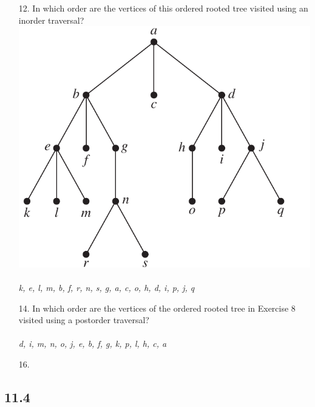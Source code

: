 \begin{itemize}
    \item[12.]  In which order are the vertices of this ordered rooted tree
          visited using an inorder traversal? \\
          \includegraphics[scale=0.6]{img/11_3_12_tree.png} \\
          \answer \\
         \textit{k, e, l, m, b, f, r, n, s, g, a, c, o, h, d, i, p, j, q}

    \item[14.] In which order are the vertices of the ordered rooted tree
in Exercise 8 visited using a postorder traversal?\\
\answer \\
\textit{d, i, m, n, o, j, e, b, f, g, k, p, l, h, c, a}

\item[16.] 


\end{itemize}

\subsection{11.4}
